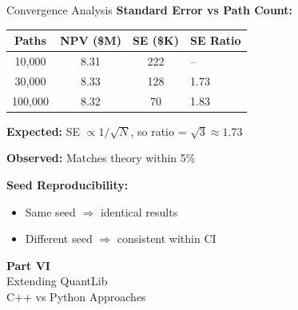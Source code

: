 \documentclass[aspectratio=169,11pt]{beamer}
\begin{document}
\begin{frame}{Convergence Analysis}
\textbf{Standard Error vs Path Count:}
\begin{center}
\begin{tabular}{cccl}
\toprule
Paths & NPV (\$M) & SE (\$K) & SE Ratio \\
\midrule
10,000 & 8.31 & 222 & -- \\
30,000 & 8.33 & 128 & 1.73 \\
100,000 & 8.32 & 70 & 1.83 \\
\bottomrule
\end{tabular}
\end{center}

\textbf{Expected:} SE $\propto 1/\sqrt{N}$, so ratio = $\sqrt{3} \approx 1.73$

\textbf{Observed:} Matches theory within 5\%

\textbf{Seed Reproducibility:}
\begin{itemize}
    \item Same seed $\Rightarrow$ identical results
    \item Different seed $\Rightarrow$ consistent within CI
\end{itemize}
\end{frame}


\begin{frame}{}
\begin{center}
\Huge\textbf{Part VI}\\[1cm]
\Large Extending QuantLib\\[0.5cm]
\normalsize C++ vs Python Approaches
\end{center}
\end{frame}
\end{document}
